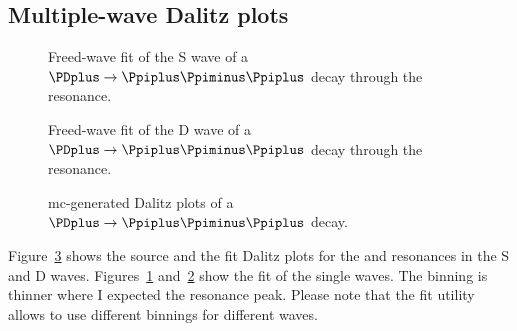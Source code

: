 \subsection{Multiple-wave Dalitz plots}

    \begin{figure}
        \centering

        \subfloat[][\label{fig:f0_phase_fit}]{}

        \subfloat[][]{}

        \caption{Freed-wave fit of the S wave of a $\PDplus \to \Ppiplus\Ppiminus\Ppiplus$ decay through the \Pfnez{} resonance.~\Square} 
        \label{fig:f0_f2:f0_fit}
    \end{figure}
    \begin{figure}
        \centering



        \caption{Freed-wave fit of the D wave of a $\PDplus \to \Ppiplus\Ppiminus\Ppiplus$ decay through the \Pfii{} resonance.~\Square}
        \label{fig:f0_f2:f2_fit}
    \end{figure}
    \begin{figure}
        \centering

        \caption{\ac{mc}-generated Dalitz plots of a $\PDplus \to \Ppiplus\Ppiminus\Ppiplus$ decay.~\Square}
        \label{fig:f0_f2_dalitz}
    \end{figure}
    Figure~\ref{fig:f0_f2_dalitz} shows the source and the fit Dalitz plots for the \Pfnez{} and \Pfii{} resonances in the S and D waves.
    Figures~\ref{fig:f0_f2:f0_fit} and~\ref{fig:f0_f2:f2_fit} show the fit of the single waves.
    The binning is thinner where I expected the resonance peak.
    Please note that the fit utility allows to use different binnings for different waves.


